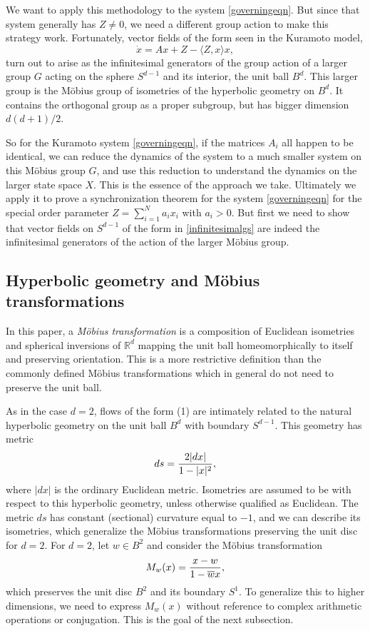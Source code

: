 \documentclass[%
 aip,
 amsmath,amssymb,
 reprint,%
]{revtex4-1}
\begin{document}
We want to apply this methodology to the system \eqref{governingeqn}. But since that system generally has $Z \ne 0$, we need a different group action to make this strategy work. Fortunately, vector fields of the form seen in the Kuramoto model, 
\begin{equation}
 \dot x = Ax + Z - \langle Z, x \rangle x,
 \label{infinitesimalgs}
\end{equation}
 turn out to arise as the infinitesimal generators of the group action of a larger group $G$ acting on the sphere $S^{d-1}$ and its interior, the unit ball $B^d$.  This larger group is the M\"obius group of isometries of the hyperbolic geometry on $B^d$.  It contains the orthogonal group as a proper subgroup, but has bigger dimension $d(d+1)/2$.

So for the Kuramoto system \eqref{governingeqn}, if the matrices $A_i$ all happen to be identical, we can reduce the dynamics of the system to a much smaller system on this Möbius group $G$, and use this reduction to understand the dynamics on the larger state space $X$.  This is the essence of the approach we take. Ultimately we apply it to prove a synchronization theorem for the system \eqref{governingeqn} for the special order parameter 
$Z = \sum_{i=1}^N a_i x_i$ 
with $ a_i  > 0$. But first we need to show that vector fields on $S^{d-1}$ of the form in   \eqref{infinitesimalgs} are indeed the infinitesimal generators of the action of the larger M\"obius group.

\subsection{\label{sec:level2}Hyperbolic geometry and Möbius transformations}

In this paper, a \emph{Möbius transformation} is a composition of Euclidean isometries and spherical inversions of $\mathbb{R}^d$ mapping the unit ball homeomorphically to itself and preserving orientation. This is a more restrictive definition than the commonly defined Möbius transformations which in general do not need to preserve the unit ball. 

As in the case $d=2$, flows of the form (1) are intimately related to the natural hyperbolic geometry on the unit ball $B^d$ with boundary $S^{d-1}$.  This geometry has metric
$$
ds = {2 |dx| \over 1 - |x|^2},
$$
where $|dx|$ is the ordinary Euclidean metric. Isometries are assumed to be with respect to this hyperbolic geometry, unless otherwise qualified as Euclidean. The metric $ds$ has constant (sectional) curvature equal to $-1$, and we can describe its isometries, which generalize the M\"obius transformations preserving the unit disc for $d=2$. For $d = 2$, let $w \in B^2$ and consider the M\"obius transformation
$$
M_w(x) = {x-w \over 1-\overline w x},
$$
which preserves the unit disc $B^2$ and its boundary $S^1$.  To generalize this to higher dimensions, we need to express $M_w(x)$ without reference to complex arithmetic operations or conjugation.  This is the goal of the next subsection. 
\end{document}
